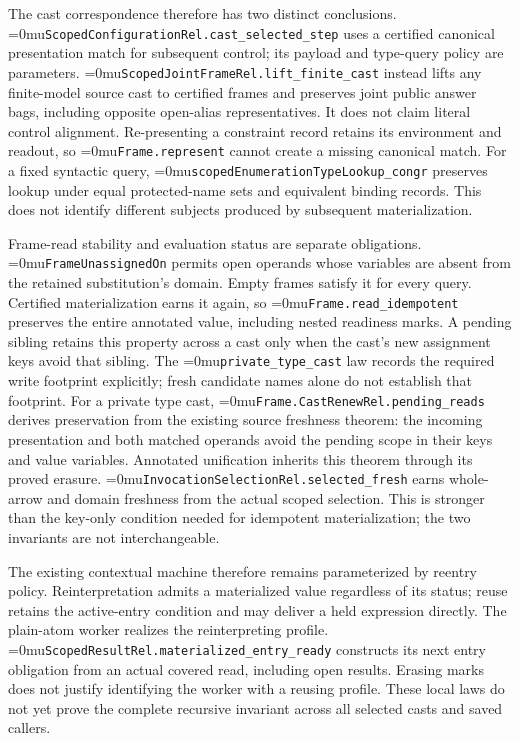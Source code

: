\documentclass[11pt,a4paper]{article}
\newcommand{\name}[1]{\textup{\Urlmuskip=0mu\relax\nolinkurl{#1}}}
\begin{document}
The cast correspondence therefore has two distinct conclusions.
\name{ScopedConfigurationRel.cast_selected_step} uses a certified canonical
presentation match for subsequent control; its payload and type-query policy
are parameters. \name{ScopedJointFrameRel.lift_finite_cast} instead lifts any
finite-model source cast to certified frames and preserves joint public answer
bags, including opposite open-alias representatives. It does not claim literal
control alignment. Re-presenting a constraint record retains its environment
and readout, so \name{Frame.represent} cannot create a missing canonical match.
For a fixed syntactic query, \name{scopedEnumerationTypeLookup_congr} preserves
lookup under equal protected-name sets and equivalent binding records. This
does not identify different subjects produced by subsequent materialization.

Frame-read stability and evaluation status are separate obligations.
\name{FrameUnassignedOn} permits open operands whose variables are absent
from the retained substitution's domain. Empty frames satisfy it for every
query. Certified materialization earns it again, so
\name{Frame.read_idempotent} preserves the entire annotated value, including
nested readiness marks. A pending sibling retains this property across a
cast only when the cast's new assignment keys avoid that sibling. The
\name{private_type_cast} law records the required write footprint explicitly;
fresh candidate names alone do not establish that footprint. For a private
type cast, \name{Frame.CastRenewRel.pending_reads} derives preservation from
the existing source freshness theorem: the incoming presentation and both
matched operands avoid the pending scope in their keys and value variables.
Annotated unification inherits this theorem through its proved erasure.
\name{InvocationSelectionRel.selected_fresh} earns whole-arrow and domain
freshness from the actual scoped selection. This is stronger than the
key-only condition needed for idempotent materialization; the two invariants
are not interchangeable.

The existing contextual machine therefore remains parameterized by reentry
policy. Reinterpretation admits a materialized value regardless of its
status; reuse retains the active-entry condition and may deliver a held
expression directly. The plain-atom worker realizes the reinterpreting
profile. \name{ScopedResultRel.materialized_entry_ready} constructs its next
entry obligation from an actual covered read, including open results.
Erasing marks does not justify identifying the worker with a reusing profile.
These local laws do not yet prove the complete recursive invariant across
all selected casts and saved callers.
\end{document}
